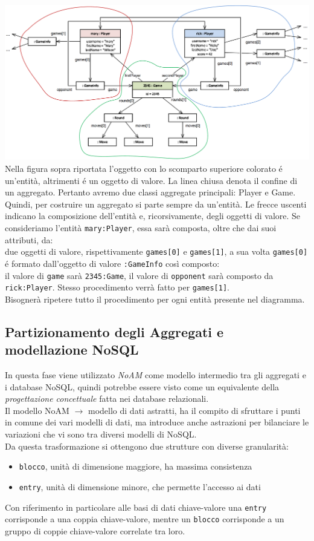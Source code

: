 \includegraphics[width=1.05\textwidth]{img/designAggregati}
Nella figura sopra riportata l'oggetto con lo scomparto superiore colorato é un'entità, altrimenti
é un oggetto di valore. La linea chiusa denota il confine di un aggregato.
Pertanto avremo due classi aggregate principali: Player e Game.\\
Quindi, per costruire un aggregato si parte sempre da un'entità.
Le frecce uscenti indicano la composizione dell'entità e, ricorsivamente, degli oggetti di valore.
Se consideriamo l'entità \texttt{mary:Player}, essa sarà composta, oltre che dai suoi attributi, da:\\
due oggetti di valore, rispettivamente \texttt{games[0]} e \texttt{games[1]}, a sua volta \texttt{games[0]} é formato dall'oggetto
di valore \texttt{:GameInfo} così composto:\\
il valore di \texttt{game} sarà \texttt{2345:Game}, il valore di \texttt{opponent} sarà composto da \texttt{rick:Player}.
Stesso procedimento verrà fatto per \texttt{games[1]}.\\
Bisognerà ripetere tutto il procedimento per ogni entità presente nel diagramma.


\subsection{Partizionamento degli Aggregati e modellazione NoSQL}
In questa fase viene utilizzato \emph{NoAM} come modello intermedio tra gli aggregati e i database NoSQL, quindi potrebbe
essere visto come un equivalente della \emph{progettazione concettuale} fatta nei database relazionali.\\
Il modello NoAM $\to$ modello di dati astratti, ha il compito di sfruttare i punti in comune dei vari modelli di dati, ma
introduce anche astrazioni per bilanciare le variazioni che vi sono tra diversi modelli di NoSQL.\\
Da questa trasformazione si ottengono due strutture con diverse granularità:\\
\begin{itemize}
    \item \texttt{blocco}, unità di dimensione maggiore, ha massima consistenza
    \item \texttt{entry}, unità di dimensione minore, che permette l'accesso ai dati
\end{itemize}
Con riferimento in particolare alle basi di dati chiave-valore una \texttt{entry} corrisponde a una coppia chiave-valore, mentre
un \texttt{blocco} corrisponde a un gruppo di coppie chiave-valore correlate tra loro.


